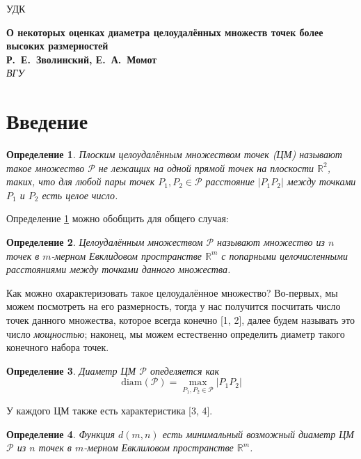 \documentclass[12pt]{article}
\theoremstyle{theorem}
\theoremstyle{dfn}
\newtheorem{dfn}{Определение}
\theoremstyle{remark}
\begin{document}

\noindent УДК

\begin{center}
\textbf{О некоторых оценках диаметра целоудалённых множеств точек более высоких размерностей} \\[3mm]
\textbf{Р.~Е.~Зволинский, Е.~А.~Момот} \\[2mm]
\emph{ВГУ}
\end{center}

\section{Введение}

\begin{dfn}\label{dfn1}
	Плоским целоудалённым множеством точек (ЦМ) называют такое 
	множество $\mathcal{P}$ не лежащих на одной прямой точек на 
	плоскости $\mathbb{R}^{2}$, таких, что для любой пары 
	точек $P_{1}, P_{2} \in \mathcal{P}$ 
	расстояние $|P_{1}P_{2}|$ между точками $P_{1}$ и $P_{2}$ есть целое число.
\end{dfn}

Определение \ref{dfn1} можно обобщить для общего случая:

\begin{dfn}
	Целоудалённым множеством $\mathcal{P}$ называют множество из $n$ точек в
	$m$-мерном Евклидовом пространстве $\mathbb{R}^{m}$ с
	попарными  целочисленными  расстояниями между точками данного множества.
\end{dfn}

Как можно охарактеризовать такое целоудалённое множество?
Во-первых, мы можем посмотреть на его размерность,
тогда у нас получится посчитать число точек данного множества, которое всегда конечно [1, 2], далее будем называть это число \textit{мощностью};
наконец, мы можем естественно определить диаметр такого конечного набора точек.

\begin{dfn}
	Диаметр ЦМ $\mathcal{P}$ опеделяется как
	\begin{equation}
		\operatorname{diam(\mathcal{P})} = \underset{P_{1}, P_{2} \in
		\mathcal{P}}{\max} |P_{1}P_{2}|
	\end{equation}
\end{dfn}

У каждого ЦМ также есть характеристика
[3, 4].

\begin{dfn}
	Функция $d(m, n)$ есть минимальный возможный диаметр ЦМ $\mathcal{P}$ из $n$ 
	точек в $m$-мерном Евклиловом пространстве $\mathbb{R}^{m}$.
\end{dfn}
\end{document}
